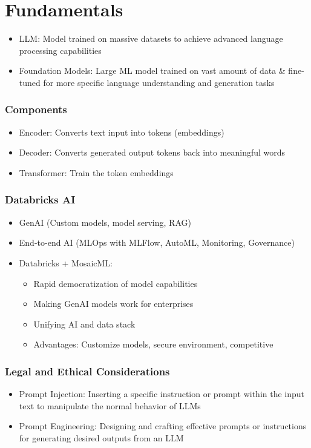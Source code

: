 \documentclass[11pt]{scrartcl}
\begin{document}
\tableofcontents

\newpage
\section*{Fundamentals}
\begin{itemize}
	\item LLM: Model trained on massive datasets to achieve advanced language processing capabilities
	\item Foundation Models: Large ML model trained on vast amount of data \& fine-tuned for more specific language understanding and generation tasks 
\end{itemize}

\subsubsection*{Components}
\begin{itemize}
	\item Encoder: Converts text input into tokens (embeddings)
	\item Decoder: Converts generated output tokens back into meaningful words
	\item Transformer: Train the token embeddings
\end{itemize}

\subsubsection*{Databricks AI}
\begin{itemize}
	\item GenAI (Custom models, model serving, RAG)
	\item End-to-end AI (MLOps with MLFlow, AutoML, Monitoring, Governance)
	\item Databricks + MosaicML:
	\begin{itemize}
		\item Rapid democratization of model capabilities
		\item Making GenAI models work for enterprises
		\item Unifying AI and data stack
		\item Advantages: Customize models, secure environment, competitive
	\end{itemize}
\end{itemize}

\subsubsection*{Legal and Ethical Considerations}
\begin{itemize}
	\item Prompt Injection: Inserting a specific instruction or prompt within the input text to manipulate the normal behavior of LLMs
	\item Prompt Engineering: Designing and crafting effective prompts or instructions for generating desired outputs from an LLM
\end{itemize}
\end{document}
